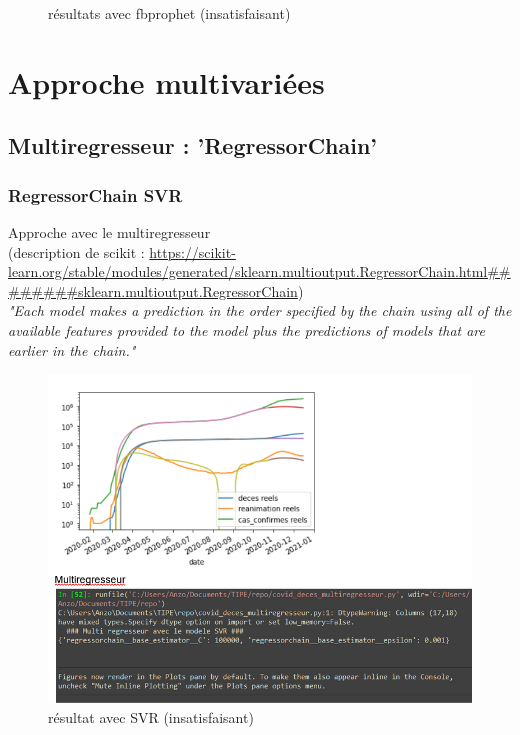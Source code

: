 \documentclass{beamer}
\begin{document}
\begin{frame}
\begin{figure}[t]
\begin{minipage}{0.3\textwidth}
		\end{minipage}
	\caption{résultats avec fbprophet (insatisfaisant)}
	\end{figure}
\end{frame}

\section{Approche multivariées}
\subsection{Multiregresseur : 'RegressorChain'}
\begin{frame}
	\frametitle{RegressorChain SVR}
	Approche avec le multiregresseur\\
	\tiny{(description de scikit : \url{https://scikit-learn.org/stable/modules/generated/sklearn.multioutput.RegressorChain.html########sklearn.multioutput.RegressorChain})}\\
	\normalsize{\textit{"Each model makes a prediction in the order specified by the chain using all of the available features provided to the model plus the predictions of models that are earlier in the chain."}}
	\begin{figure}[h]
		\includegraphics[scale=0.3]{mulitregr_epic_fail}
		\caption{résultat avec SVR (insatisfaisant)}
	\end{figure}
\end{frame}
\end{document}
